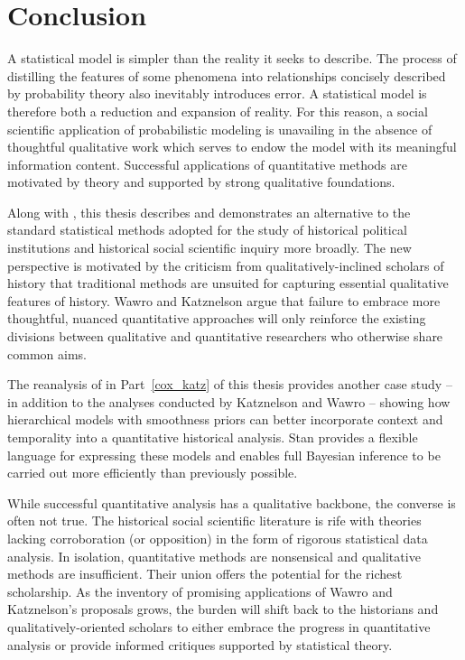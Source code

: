 \chapter{Conclusion}
\label{discussion}

A statistical model is simpler than the reality it seeks to describe. The process of 
distilling the features of some phenomena into relationships concisely described by  
probability theory also inevitably introduces error. A statistical model is therefore both 
a reduction and expansion of reality. For this reason, a social scientific application of 
probabilistic modeling is unavailing in the absence of thoughtful qualitative work which
serves to endow the model with its meaningful information content.
Successful applications of quantitative methods are motivated by theory and supported by 
strong qualitative foundations. 

Along with , this thesis describes and demonstrates 
an alternative to the standard statistical methods adopted for the study of historical 
political institutions and historical social scientific inquiry more broadly. The new perspective is 
motivated by the criticism from qualitatively-inclined scholars of history that traditional methods 
are unsuited for capturing essential qualitative features of history. 
Wawro and Katznelson argue that failure to embrace more thoughtful, nuanced quantitative 
approaches will only reinforce the existing divisions between qualitative and quantitative 
researchers who otherwise share common aims. 

The reanalysis of  in Part~\ref{cox_katz} of this thesis 
provides another case study -- in addition to the analyses conducted by Katznelson and 
Wawro -- showing how hierarchical models with smoothness priors can better incorporate 
context and temporality into a quantitative historical analysis. Stan provides a flexible language 
for expressing these models and enables full Bayesian inference to be carried out 
more efficiently than previously possible.  

While successful quantitative analysis has a qualitative backbone, the converse
is often not true. The historical social scientific literature is rife with 
theories lacking corroboration (or opposition) in the form of rigorous 
statistical data analysis. In isolation, quantitative methods are nonsensical and
qualitative methods are insufficient. Their union offers the potential for the richest 
scholarship.  As the inventory of promising applications of Wawro and 
Katznelson's proposals grows, the burden will shift back to the historians and 
qualitatively-oriented scholars to either embrace the progress in quantitative analysis 
or provide informed critiques supported by statistical theory. 

